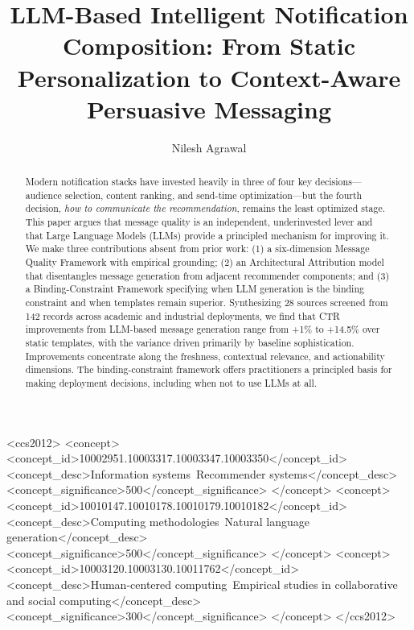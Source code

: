 \documentclass[sigconf]{acmart}
\begin{document}
\title{LLM-Based Intelligent Notification Composition: From Static Personalization to Context-Aware Persuasive Messaging}

\author{Nilesh Agrawal}

\renewcommand{\shortauthors}{}
\fancyhead{} %

\begin{abstract}
Modern notification stacks have invested heavily in three of four key decisions---audience selection, content ranking, and send-time optimization---but the fourth decision, \textit{how to communicate the recommendation}, remains the least optimized stage. This paper argues that message quality is an independent, underinvested lever and that Large Language Models (LLMs) provide a principled mechanism for improving it. We make three contributions absent from prior work: (1) a six-dimension Message Quality Framework with empirical grounding; (2) an Architectural Attribution model that disentangles message generation from adjacent recommender components; and (3) a Binding-Constraint Framework specifying when LLM generation is the binding constraint and when templates remain superior. Synthesizing 28 sources screened from 142 records across academic and industrial deployments, we find that CTR improvements from LLM-based message generation range from +1\% to +14.5\% over static templates, with the variance driven primarily by baseline sophistication. Improvements concentrate along the freshness, contextual relevance, and actionability dimensions. The binding-constraint framework offers practitioners a principled basis for making deployment decisions, including when not to use LLMs at all.
\end{abstract}

\begin{CCSXML}
<ccs2012>
   <concept>
       <concept_id>10002951.10003317.10003347.10003350</concept_id>
       <concept_desc>Information systems~Recommender systems</concept_desc>
       <concept_significance>500</concept_significance>
       </concept>
   <concept>
       <concept_id>10010147.10010178.10010179.10010182</concept_id>
       <concept_desc>Computing methodologies~Natural language generation</concept_desc>
       <concept_significance>500</concept_significance>
       </concept>
   <concept>
       <concept_id>10003120.10003130.10011762</concept_id>
       <concept_desc>Human-centered computing~Empirical studies in collaborative and social computing</concept_desc>
       <concept_significance>300</concept_significance>
       </concept>
 </ccs2012>
\end{CCSXML}
\end{document}

